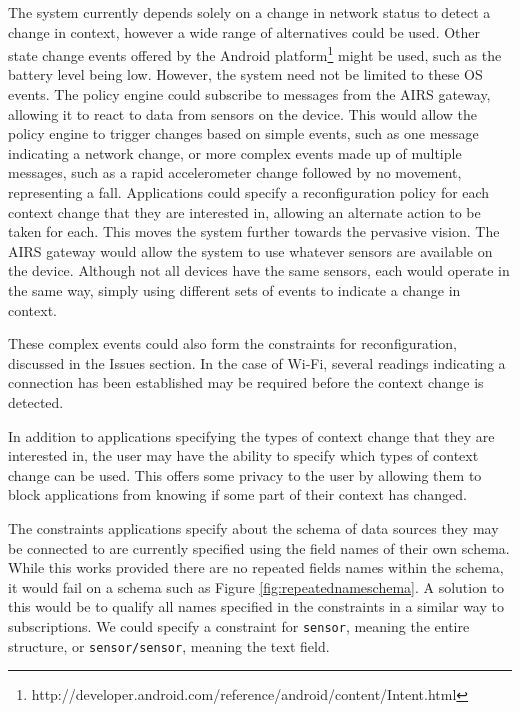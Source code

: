 \documentclass[12pt,twoside,notitlepage]{report}
\begin{document}
The system currently depends solely on a change in network status to detect a change in context, however a wide range of alternatives could be used. 
Other state change events offered by the Android platform\footnote{http://developer.android.com/reference/android/content/Intent.html} might be used, such as the battery level being low. 
However, the system need not be limited to these OS events. 
The policy engine could subscribe to messages from the AIRS gateway, allowing it to react to data from sensors on the device. 
This would allow the policy engine to trigger changes based on simple events, such as one message indicating a network change, or more complex events made up of multiple messages, such as a rapid accelerometer change followed by no movement, representing a fall. 
Applications could specify a reconfiguration policy for each context change that they are interested in, allowing an alternate action to be taken for each. 
This moves the system further towards the pervasive vision. 
The AIRS gateway would allow the system to use whatever sensors are available on the device. 
Although not all devices have the same sensors, each would operate in the same way, simply using different sets of events to indicate a change in context.

These complex events could also form the constraints for reconfiguration, discussed in the Issues section. 
In the case of Wi-Fi, several readings indicating a connection has been established may be required before the context change is detected. 

In addition to applications specifying the types of context change that they are interested in, the user may have the ability to specify which types of context change can be used. 
This offers some privacy to the user by allowing them to block applications from knowing if some part of their context has changed.

The constraints applications specify about the schema of data sources they may be connected to are currently specified using the field names of their own schema.
While this works provided there are no repeated fields names within the schema, it would fail on a schema such as Figure \ref{fig:repeatednameschema}. 
A solution to this would be to qualify all names specified in the constraints in a similar way to subscriptions. 
We could specify a constraint for {\tt sensor}, meaning the entire structure, or {\tt sensor/sensor}, meaning the text field.
\end{document}
